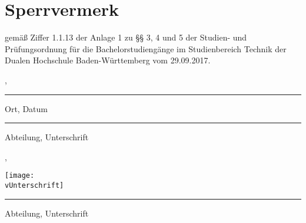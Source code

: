 \thispagestyle{empty}
\section*{\Huge{Sperrvermerk}}

gemäß Ziffer 1.1.13 der Anlage 1 zu §§ 3, 4 und 5  der Studien- und Prüfungsordnung für die Bachelorstudiengänge im Studienbereich Technik der Dualen Hochschule Baden-Würt­tem­berg vom 29.09.2017.\\

\noindent {}

\vfill
\leavevmode
\newline
\parbox{6cm}{\strut\centering \vBearbeitungsort, \vAbgabedatum\hrule\strut\centering\footnotesize Ort, Datum} 
\hfill
\ifx\vUnterschrift\empty
\parbox{6cm}{\strut\hspace{1pt} \vAbteilung\hrule\strut\centering\footnotesize Abteilung, Unterschrift}
\else
\parbox{6cm}{\strut\hspace{1pt} \vAbteilung, \parbox[b]{3cm}{\vspace{-10cm}\texttt{[image: \\vUnterschrift]}}\hrule\strut\centering\footnotesize Abteilung, Unterschrift}
\fi
\vspace{1cm}

\newpage